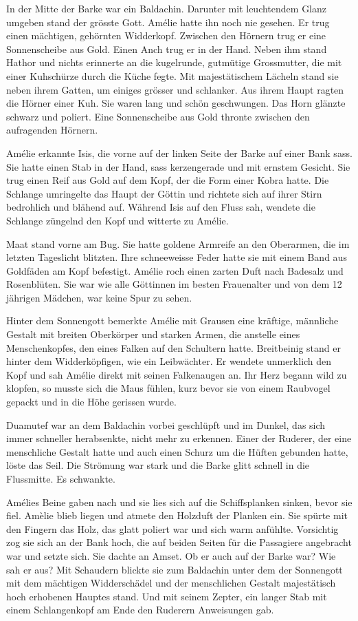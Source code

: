 \documentclass[11pt,titlepage,a5paper]{book}
\begin{document}
In der Mitte der Barke war ein Baldachin. Darunter mit leuchtendem Glanz umgeben stand der grösste Gott. Amélie hatte ihn noch nie gesehen. Er trug einen mächtigen, gehörnten Widderkopf. Zwischen den Hörnern trug er eine Sonnenscheibe aus Gold. Einen Anch trug er in der Hand. Neben ihm stand Hathor und nichts erinnerte an die kugelrunde, gutmütige Grossmutter, die mit einer Kuhschürze durch die Küche fegte. Mit majestätischem Lächeln stand sie neben ihrem Gatten, um einiges grösser und schlanker. Aus ihrem Haupt ragten die Hörner einer Kuh. Sie waren lang und schön geschwungen. Das Horn glänzte schwarz und poliert. Eine Sonnenscheibe aus Gold thronte zwischen den aufragenden Hörnern. 

Amélie erkannte Isis, die vorne auf der linken Seite der Barke auf einer Bank sass. Sie hatte einen Stab in der Hand, sass kerzengerade und mit ernstem Gesicht. Sie trug einen Reif aus Gold auf dem Kopf, der die Form einer Kobra hatte. Die Schlange umringelte das Haupt der Göttin und richtete sich auf ihrer Stirn bedrohlich und blähend auf. Während Isis auf den Fluss sah, wendete die Schlange züngelnd den Kopf und witterte zu Amélie. 

Maat stand vorne am Bug. Sie hatte goldene Armreife an den Oberarmen, die im letzten Tageslicht blitzten. Ihre schneeweisse Feder hatte sie mit einem Band aus Goldfäden am Kopf befestigt. Amélie roch einen zarten Duft nach Badesalz und Rosenblüten. Sie war wie alle Göttinnen im besten Frauenalter und von dem 12 jährigen Mädchen, war keine Spur zu sehen. 

Hinter dem Sonnengott bemerkte Amélie mit Grausen eine kräftige, männliche Gestalt mit breiten Oberkörper und starken Armen, die anstelle eines Menschenkopfes, den eines Falken auf den Schultern hatte. Breitbeinig stand er hinter dem Widderköpfigen, wie ein Leibwächter. Er wendete unmerklich den Kopf und sah Amélie direkt mit seinen Falkenaugen an. Ihr Herz begann wild zu klopfen, so musste sich die Maus fühlen, kurz bevor sie von einem Raubvogel gepackt und in die Höhe gerissen wurde.  

Duamutef war an dem Baldachin vorbei geschlüpft und im Dunkel, das sich immer schneller herabsenkte, nicht mehr zu erkennen. Einer der Ruderer, der eine menschliche Gestalt hatte und auch einen Schurz um die Hüften gebunden hatte, löste das Seil. Die Strömung war stark und die Barke glitt schnell in die Flussmitte. Es schwankte.

Amélies Beine gaben nach und sie lies sich auf die Schiffsplanken sinken, bevor sie fiel. Amèlie blieb liegen und atmete den Holzduft der Planken ein. Sie spürte mit den Fingern das Holz, das glatt poliert war und sich warm anfühlte. Vorsichtig zog sie sich an der Bank hoch, die auf beiden Seiten für die Passagiere angebracht war und setzte sich. Sie dachte an Amset. Ob er auch auf der Barke war? Wie sah er aus? Mit Schaudern blickte sie zum Baldachin unter dem der Sonnengott mit dem mächtigen Widderschädel und der menschlichen Gestalt majestätisch hoch erhobenen Hauptes stand.  Und mit seinem Zepter, ein langer Stab mit einem Schlangenkopf am Ende den Ruderern Anweisungen gab.
\end{document}
